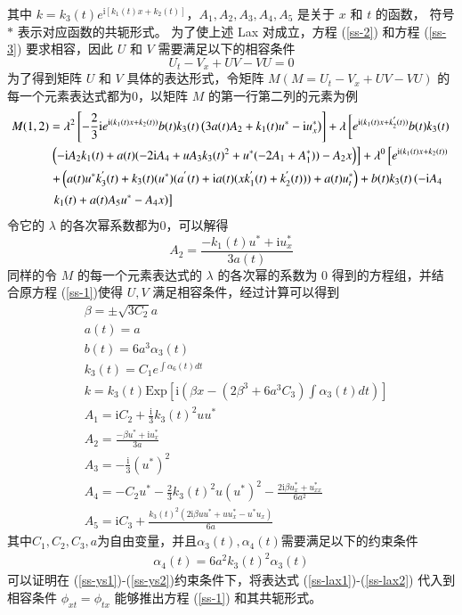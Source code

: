 其中 $k=k_{3}(t)e^{\mathrm{i}[k_{1}(t)x + k_{2}(t)]}$，$A_1, A_2, A_3, A_4, A_5$ 是关于 $x$ 和 $t$ 的函数，  符号 $*$ 表示对应函数的共轭形式。
为了使上述 Lax 对成立，方程 (\ref{ss-2}) 和方程 (\ref{ss-3}) 要求相容，因此 $U$ 和 $V$ 需要满足以下的相容条件
\begin{equation}
  U_t - V_x + UV - VU = 0
\end{equation}
为了得到矩阵 $U$ 和 $V$ 具体的表达形式，令矩阵 $M (M = U_t - V_x + UV - VU)$ 的每一个元素表达式都为0，以矩阵 $M$ 的第一行第二列的元素为例
\begin{align}
  M(1,2)&=  \lambda^2\left[-\frac{2}{3}\mathrm{i}e^{\mathrm{i}(k_1(t)x+k_2(t))}b(t)k_3(t)\left(3a(t)A_2+k_1(t)u^*-\mathrm{i}u^*_x\right)\right] + \lambda \left[e^{\mathrm{i}(k_1(t)x+ k_2^{'}(t))}b(t)k_3(t) \right.  \notag\\
  & \left. \left(-\mathrm{i}A_2k_1(t)+a(t)(-2\mathrm{i}A_4+uA_3k_3(t)^2+u^*(-2A_1+A_1^*))-A_2x\right)\right] + \lambda^0 \left[e^{\mathrm{i}(k_1(t)x+k_2(t))} \right. \notag \\
  & \left. + \left(a(t)u^*k_3^{'}(t)+k_3(t)(u^*)(a^{'}(t)+ \mathrm{i}a(t)(xk_1^{'}(t)+ k_2^{'}(t)))+a(t)u^*_t\right)+b(t)k_3(t)\left(-\mathrm{i}A_4 \right. \right. \notag \\
  & \left. \left.k_1(t) +a(t)A_5u^*-A_4x\right)\right]
\end{align}
令它的 $\lambda$ 的各次幂系数都为0，可以解得
\begin{equation}
  A_2 = \frac{-k_1(t)u^*+\mathrm{i}u^*_x}{3a(t)}
\end{equation}
同样的令 $M$ 的每一个元素表达式的 $\lambda$ 的各次幂的系数为 0 得到的方程组，并结合原方程 (\ref{ss-1})使得 $U, V$ 满足相容条件，经过计算可以得到
\begin{align}
  & \beta = \pm \sqrt{3C_{2}}a \label{ss-ys1}\\
  & a(t) = a \\
  & b(t) = 6a^{3}\alpha_{3}(t) \\
  & k_{3}(t) = C_1e^{\int \alpha_{6}(t)dt}   \\
  & k = k_{3}(t)\mathrm{Exp}\left[\mathrm{i}\left(\beta x - (2\beta^{3} + 6a^{3}C_{3})\int \alpha_{3}(t)dt \right)\right] \\
  & A_{1} = \mathrm{i}C_{2} + \frac{\mathrm{i}}{3}k_{3}(t)^{2}uu^{*} \\
  & A_{2} = \frac{-\beta u^{*} + \mathrm{i}u^{*}_{x}}{3a}   \\
  & A_{3} = -\frac{\mathrm{i}}{3}(u^{*})^{2}  \\
  & A_{4} = -C_{2}u^{*} - \frac{2}{3}k_{3}(t)^{2}u(u^{*})^{2} - \frac{2\mathrm{i}\beta u^{*}_{x} + u^{*}_{xx}}{6a^{2}} \\
  & A_{5} = \mathrm{i}C_{3} + \frac{k_{3}(t)^{2}(2\mathrm{i}\beta uu^{*} + uu^{*}_{x} - u^{*}u_{x})}{6a} \label{ss-ys2}
\end{align}
其中$C_1, C_{2}, C_{3}, a$为自由变量，并且$\alpha_{3}(t), \alpha_{4}(t)$需要满足以下的约束条件
\begin{align}
  \alpha_{4}(t) = 6a^{2}k_{3}(t)^{2}\alpha_{3}(t)
\end{align}
可以证明在 (\ref{ss-ys1})-(\ref{ss-ys2})约束条件下，将表达式 (\ref{ss-lax1})-(\ref{ss-lax2}) 代入到相容条件  $\phi_{xt} = \phi_{tx}$ 能够推出方程 (\ref{ss-1}) 和其共轭形式。

